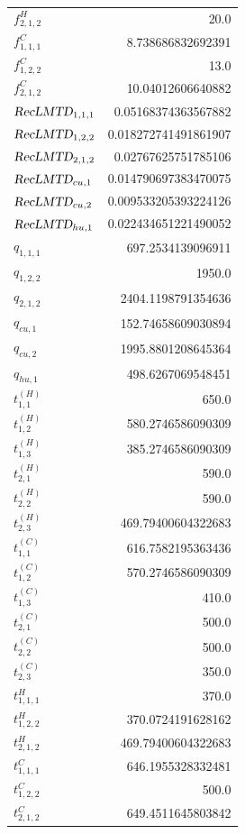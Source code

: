 \documentclass{article}%
\begin{document}
\begin{multicols*}{3}
\begin{supertabular}{lr}
	$f_{2,1,2}^{H}$ & 20.0 \\%
	$f_{1,1,1}^{C}$ & 8.738686832692391 \\%
	$f_{1,2,2}^{C}$ & 13.0 \\%
	$f_{2,1,2}^{C}$ & 10.04012606640882 \\%
	$\textsl{RecLMTD}_{1,1,1}$ & 0.05168374363567882 \\%
	$\textsl{RecLMTD}_{1,2,2}$ & 0.018272741491861907 \\%
	$\textsl{RecLMTD}_{2,1,2}$ & 0.02767625751785106 \\%
	$\textsl{RecLMTD}_{cu,1}$ & 0.014790697383470075 \\%
	$\textsl{RecLMTD}_{cu,2}$ & 0.009533205393224126 \\%
	$\textsl{RecLMTD}_{hu,1}$ & 0.022434651221490052 \\%
	$q_{1,1,1}$ & 697.2534139096911 \\%
	$q_{1,2,2}$ & 1950.0 \\%
	$q_{2,1,2}$ & 2404.1198791354636 \\%
	$q_{cu,1}$ & 152.74658609030894 \\%
	$q_{cu,2}$ & 1995.8801208645364 \\%
	$q_{hu,1}$ & 498.6267069548451 \\%
	$t_{1,1}^{(H)}$ & 650.0 \\%
	$t_{1,2}^{(H)}$ & 580.2746586090309 \\%
	$t_{1,3}^{(H)}$ & 385.2746586090309 \\%
	$t_{2,1}^{(H)}$ & 590.0 \\%
	$t_{2,2}^{(H)}$ & 590.0 \\%
	$t_{2,3}^{(H)}$ & 469.79400604322683 \\%
	$t_{1,1}^{(C)}$ & 616.7582195363436 \\%
	$t_{1,2}^{(C)}$ & 570.2746586090309 \\%
	$t_{1,3}^{(C)}$ & 410.0 \\%
	$t_{2,1}^{(C)}$ & 500.0 \\%
	$t_{2,2}^{(C)}$ & 500.0 \\%
	$t_{2,3}^{(C)}$ & 350.0 \\%
	$t_{1,1,1}^{H}$ & 370.0 \\%
	$t_{1,2,2}^{H}$ & 370.0724191628162 \\%
	$t_{2,1,2}^{H}$ & 469.79400604322683 \\%
	$t_{1,1,1}^{C}$ & 646.1955328332481 \\%
	$t_{1,2,2}^{C}$ & 500.0 \\%
	$t_{2,1,2}^{C}$ & 649.4511645803842 \\%

\end{supertabular}
\end{multicols*}
\end{document}
